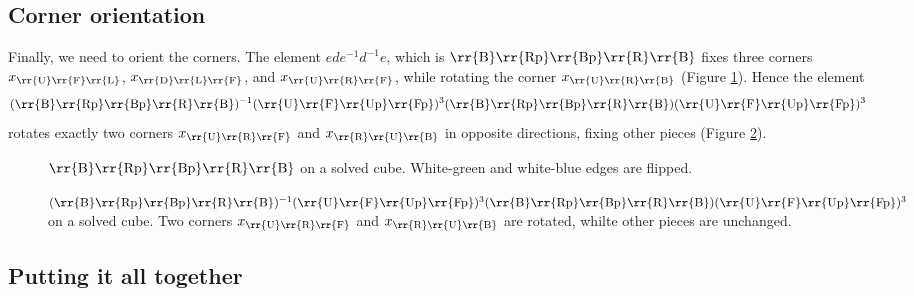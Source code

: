 \subsection{Corner orientation}

Finally, we need to orient the corners.
The element $ede^{-1}d^{-1}e$, which is $\text{\rr{B}\rr{Rp}\rr{Bp}\rr{R}\rr{B}}$ fixes three corners $x_{\text{\rr{U}\rr{F}\rr{L}}}$, $x_{\text{\rr{D}\rr{L}\rr{F}}}$, and $x_{\text{\rr{U}\rr{R}\rr{F}}}$, while rotating the corner $x_{\text{\rr{U}\rr{R}\rr{B}}}$ (Figure \ref{fig:orient-corner}).
Hence the element
\[
    (\text{\rr{B}\rr{Rp}\rr{Bp}\rr{R}\rr{B}})^{-1} (\text{\rr{U}\rr{F}\rr{Up}\rr{Fp}})^{3} (\text{\rr{B}\rr{Rp}\rr{Bp}\rr{R}\rr{B}}) (\text{\rr{U}\rr{F}\rr{Up}\rr{Fp}})^{3}
\]
rotates exactly two corners $x_{\text{\rr{U}\rr{R}\rr{F}}}$ and $x_{\text{\rr{R}\rr{U}\rr{B}}}$ in opposite directions, fixing other pieces (Figure \ref{fig:orient-corner2}).

\begin{figure}[hbt]
    \centering%
    \RubikCubeSolvedWY%
    \caption{$\text{\rr{B}\rr{Rp}\rr{Bp}\rr{R}\rr{B}}$ on a solved cube. White-green and white-blue edges are flipped.}
    \label{fig:orient-corner}
\end{figure}

\begin{figure}[hbt]
    \centering%
    \RubikCubeSolvedWY%
    \caption{$(\text{\rr{B}\rr{Rp}\rr{Bp}\rr{R}\rr{B}})^{-1} (\text{\rr{U}\rr{F}\rr{Up}\rr{Fp}})^{3} (\text{\rr{B}\rr{Rp}\rr{Bp}\rr{R}\rr{B}}) (\text{\rr{U}\rr{F}\rr{Up}\rr{Fp}})^{3}$ on a solved cube. Two corners $x_{\text{\rr{U}\rr{R}\rr{F}}}$ and $x_{\text{\rr{R}\rr{U}\rr{B}}}$ are rotated, whilte other pieces are unchanged.}
    \label{fig:orient-corner2}
\end{figure}

\subsection{Putting it all together}

